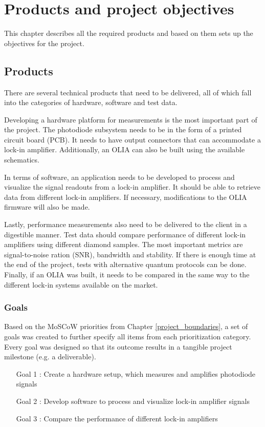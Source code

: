 \documentclass{report}
\begin{document}
	
	\chapter{Products and project objectives}
	This chapter describes all the required products and based on them sets up the objectives for the project.
	
	\section{Products}
	There are several technical products that need to be delivered, all of which fall into the categories of hardware, software and test data.
	
	Developing a hardware platform for measurements is the most important part of the project. The photodiode subsystem needs to be in the form of a printed circuit board (PCB). It needs to have output connectors that can accommodate a lock-in amplifier. Additionally, an OLIA can also be built using the available schematics. 
	
	In terms of software, an application needs to be developed to process and visualize the signal readouts from a lock-in amplifier. It should be able to retrieve data from different lock-in amplifiers. If necessary, modifications to the OLIA firmware will also be made. 
	
	Lastly, performance measurements also need to be delivered to the client in a digestible manner. Test data should compare performance of different lock-in amplifiers using different diamond samples. The most important metrics are signal-to-noise ration (SNR), bandwidth and stability. If there is enough time at the end of the project, tests with alternative quantum protocols can be done. Finally, if an OLIA was built, it needs to be compared in the same way to the different lock-in systems available on the market.
	
	\subsection{Goals} \label{chap:goals}
	Based on the MoSCoW priorities from Chapter \ref{project_boundaries}, a set of goals was created to further specify all items from each prioritization category. Every goal was designed so that its outcome results in a tangible project milestone (e.g. a deliverable).
	
	\begin{itemize}
		\item[Goal 1]: Create a hardware setup, which measures and amplifies photodiode signals
		\item[Goal 2]: Develop software to process and visualize lock-in amplifier signals
		\item[Goal 3]: Compare the performance of different lock-in amplifiers
	\end{itemize}
	
\end{document}
